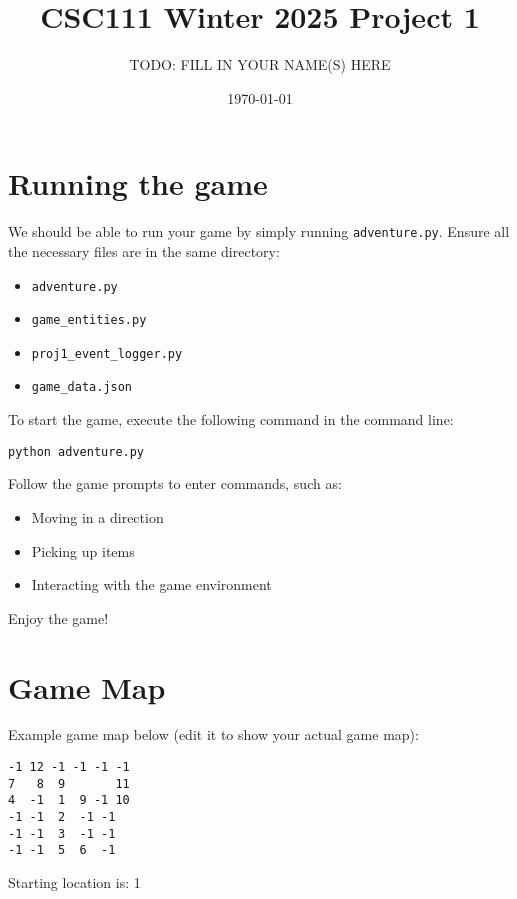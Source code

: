 \documentclass[11pt]{article}
\title{CSC111 Winter 2025 Project 1}
\author{TODO: FILL IN YOUR NAME(S) HERE}
\date{\today}
\begin{document}
\maketitle

\section*{Running the game}
We should be able to run your game by simply running \texttt{adventure.py}.
Ensure all the necessary files are in the same directory:
\begin{itemize}
    \item \texttt{adventure.py}
    \item \texttt{game_entities.py}
    \item \texttt{proj1_event_logger.py}
    \item \texttt{game_data.json}
\end{itemize}

To start the game, execute the following command in the command line:
\begin{lstlisting}
python adventure.py
\end{lstlisting}

Follow the game prompts to enter commands, such as:
\begin{itemize}
    \item Moving in a direction
    \item Picking up items
    \item Interacting with the game environment
\end{itemize}

Enjoy the game!

\section*{Game Map}
Example game map below (edit it to show your actual game map):

\begin{verbatim}
-1 12 -1 -1 -1 -1
7   8  9       11
4  -1  1  9 -1 10
-1 -1  2  -1 -1
-1 -1  3  -1 -1
-1 -1  5  6  -1
\end{verbatim}

Starting location is: 1
\end{document}
